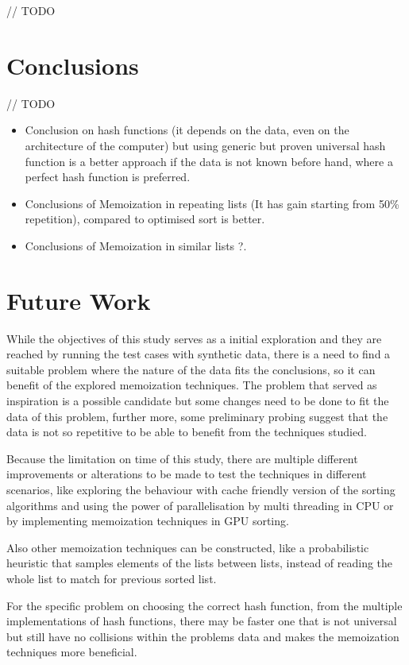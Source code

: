 \documentclass[a4paper,12pt]{article}
\begin{document}
// TODO

\section{Conclusions}

// TODO
\begin{itemize}
\item Conclusion on hash functions (it depends on the data, even on the architecture of the computer) but using generic but proven universal hash function is a better approach if the data is not known before hand, where a perfect hash function is preferred.
\item Conclusions of Memoization in repeating lists (It has gain starting from 50\% repetition), compared to optimised sort is better.
\item  Conclusions of Memoization in similar lists ?.
\end{itemize}

\section{Future Work}

While the objectives of this study serves as a initial exploration and they are reached by running the test cases with synthetic data, there is a need to find a suitable problem where the nature of the data fits the conclusions, so it can benefit of  the explored memoization techniques. The problem that served as inspiration \cite{Arch2015} is a possible candidate but some changes need to be done to fit the data of this problem, further more, some preliminary probing suggest that the data is not so repetitive to be able to benefit from the techniques studied.

Because the limitation on time of this study, there are multiple different improvements or alterations to be made to test the techniques in different scenarios, like exploring the behaviour with cache friendly version of the sorting algorithms and using the power of parallelisation by multi threading in CPU or by implementing memoization techniques in GPU sorting.

Also other memoization techniques can be constructed, like a probabilistic heuristic that samples elements of the lists between lists, instead of reading the whole list to match for previous sorted list.

For the specific problem on choosing the correct hash function, from the multiple implementations of hash functions, there may be faster one that is not universal but still have no collisions within the problems data and makes the memoization techniques more beneficial.
\end{document}

